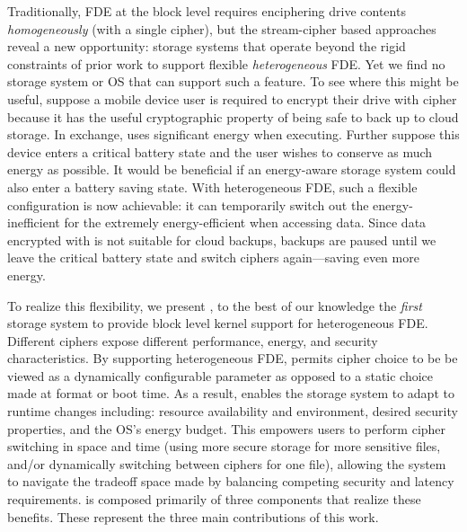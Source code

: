 Traditionally, FDE at the block level requires enciphering drive contents {\em
homogeneously} (with a single cipher), but the stream-cipher based approaches
reveal a new opportunity: storage systems that operate beyond the rigid
constraints of prior work to support flexible {\em heterogeneous} FDE. Yet we
find no storage system or OS that can support such a feature. To see where this
might be useful, suppose a mobile device user is required to encrypt their drive
with cipher \encA because it has the useful cryptographic property of being safe
to back up to cloud storage. In exchange, \encA uses significant energy when
executing. Further suppose this device enters a critical battery state and the
user wishes to conserve as much energy as possible. It would be beneficial if an
energy-aware storage system could also enter a battery saving state.  With
heterogeneous FDE, such a flexible configuration is now achievable: it can
temporarily switch out the energy-inefficient \encA for the extremely
energy-efficient \encB when accessing data. Since data encrypted with \encB is
not suitable for cloud backups, backups are paused until we leave the critical
battery state and switch ciphers again---saving even more energy.


To realize this flexibility, we present \sys, to the best of our knowledge the
{\em first} storage system to provide block level kernel support for
heterogeneous FDE. Different ciphers expose different performance, energy, and
security  characteristics. By supporting heterogeneous FDE, \sys permits cipher
choice to be be viewed as a dynamically configurable parameter as opposed to a
static choice made at format or boot time. As a result, \sys enables the storage
system to adapt to runtime changes including: resource availability and
environment, desired security properties, and the OS's energy budget. This
empowers users to perform cipher switching in space and time (\eg using more
secure storage for more sensitive files, and/or dynamically switching between
ciphers for one file), allowing the system to navigate the tradeoff space made
by balancing competing security and latency requirements.  \sys is composed
primarily of three components that realize these benefits. These represent the
three main contributions of this work.

